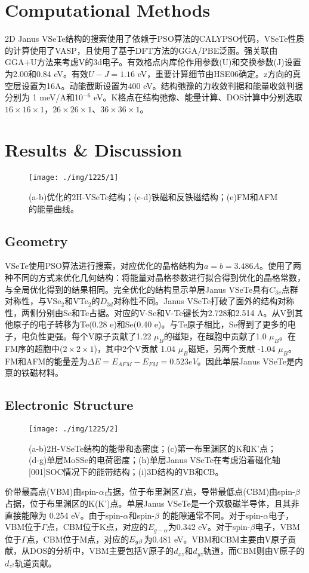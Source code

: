\documentclass[reprint, aps, prb, showkeys]{revtex4-2}
\begin{document}
\section{Computational Methods}
2D Janus VSeTe结构的搜索使用了依赖于PSO算法的CALYPSO代码，VSeTe性质的计算使用了VASP，且使用了基于DFT方法的GGA/PBE泛函。强关联由GGA+U方法来考虑V的3d电子。有效格点内库伦作用参数(U)和交换参数(J)设置为2.00和0.84 eV。有效$U - J = 1.16$ eV，重要计算细节由HSE06确定。z方向的真空层设置为16A。动能截断设置为400 eV。结构弛豫的力收敛判据和能量收敛判据分别为 1 meV/A和10$^{-6}$ eV。K格点在结构弛豫、能量计算、DOS计算中分别选取$16 \times 16 \times 1$，$26 \times 26 \times 1$、$36 \times 36 \times 1$。

\section{Results \& Discussion}
\begin{figure}[t]
    \texttt{[image: ./img/1225/1]}
    \caption{\label{fig:Structure} 
    (a-b)优化的2H-VSeTe结构；(c-d)铁磁和反铁磁结构；(e)FM和AFM的能量曲线。
    }
\end{figure}
\subsection{Geometry}
VSeTe使用PSO算法进行搜索，对应优化的晶格结构为$a = b = 3.486 A$。使用了两种不同的方式来优化几何结构：将能量对晶格参数进行拟合得到优化的晶格常数，与全局优化得到的结果相同。完全优化的结构显示单层Janus VSeTe具有$C_{3v}$点群对称性，与VSe$_2$和VTe$_2$的$D_{3d}$对称性不同。Janus VSeTe打破了面外的结构对称性，两侧分别由Se和Te占据。对应的V-Se和V-Te键长为2.728和2.514 A。从V到其他原子的电子转移为Te(0.28 e)和Se(0.40 e)。与Te原子相比，Se得到了更多的电子，电负性更强。每个V原子贡献了1.22 $\mu_B$的磁矩，在超胞中贡献了1.0 $\mu_B$。在FM序的超胞中($2 \times 2 \times 1$)，其中2个V贡献 1.04 $\mu_B$磁矩，另两个贡献 -1.04 $\mu_B$。FM和AFM的能量差为$\Delta E = E_{AFM} - E_{FM} = 0.523 eV$。因此单层Janus VSeTe是内禀的铁磁材料。

\subsection{Electronic Structure}
\begin{figure}[t]
    \texttt{[image: ./img/1225/2]}
    \caption{\label{fig:Electron} 
    (a-b)2H-VSeTe结构的能带和态密度；(c)第一布里渊区的K和K'点；(d-g)单层MoSSe的电荷密度；(h)单层Janus VSeTe在考虑沿着磁化轴[001]SOC情况下的能带结构；(i)3D结构的VB和CB。
    }
\end{figure}
价带最高点(VBM)由spin-$\alpha$占据，位于布里渊区$\Gamma$点，导带最低点(CBM)由spin-$\beta$占据，位于布里渊区的K(K')点。单层Janus VSeTe是一个双极磁半导体，且其非直接能隙为 0.254 eV。由于spin-$\alpha$和spin-$\beta$ 的能隙通常不同。对于spin-$\alpha$电子，VBM位于$\Gamma$点，CBM位于K点，对应的$E_{g-\alpha}$为0.342 eV。对于spin-$\beta$电子，VBM位于$\Gamma$点，CBM位于M点，对应的$E_{g\-\beta}$为0.481 eV。VBM和CBM主要由V原子贡献，从DOS的分析中，VBM主要包括V原子的$d_{xz}$和$d_{yz}$轨道，而CBM则由V原子的$d_{z^2}$轨道贡献。
\end{document}
